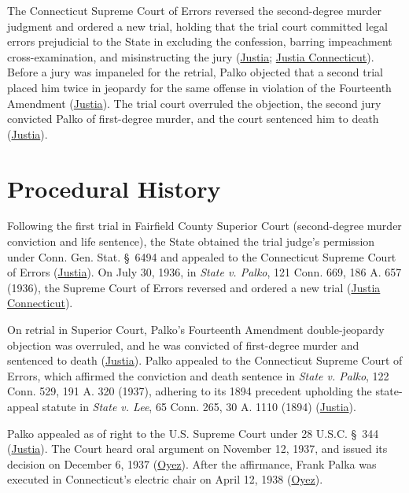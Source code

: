 \documentclass[12pt]{article}
\begin{document}
The Connecticut Supreme Court of Errors reversed the second-degree murder judgment and ordered a new trial, holding that the trial court committed legal errors prejudicial to the State in excluding the confession, barring impeachment cross-examination, and misinstructing the jury (\href{https://supreme.justia.com/cases/federal/us/302/319/}{Justia}; \href{https://law.justia.com/cases/connecticut/supreme-court/1936/121-conn-669.html}{Justia Connecticut}). Before a jury was impaneled for the retrial, Palko objected that a second trial placed him twice in jeopardy for the same offense in violation of the Fourteenth Amendment (\href{https://supreme.justia.com/cases/federal/us/302/319/}{Justia}). The trial court overruled the objection, the second jury convicted Palko of first-degree murder, and the court sentenced him to death (\href{https://supreme.justia.com/cases/federal/us/302/319/}{Justia}).

\section{Procedural History}

Following the first trial in Fairfield County Superior Court (second-degree murder conviction and life sentence), the State obtained the trial judge's permission under Conn. Gen. Stat. \S~6494 and appealed to the Connecticut Supreme Court of Errors (\href{https://supreme.justia.com/cases/federal/us/302/319/}{Justia}). On July 30, 1936, in \textit{State v. Palko}, 121 Conn. 669, 186 A. 657 (1936), the Supreme Court of Errors reversed and ordered a new trial (\href{https://law.justia.com/cases/connecticut/supreme-court/1936/121-conn-669.html}{Justia Connecticut}).

On retrial in Superior Court, Palko's Fourteenth Amendment double-jeopardy objection was overruled, and he was convicted of first-degree murder and sentenced to death (\href{https://supreme.justia.com/cases/federal/us/302/319/}{Justia}). Palko appealed to the Connecticut Supreme Court of Errors, which affirmed the conviction and death sentence in \textit{State v. Palko}, 122 Conn. 529, 191 A. 320 (1937), adhering to its 1894 precedent upholding the state-appeal statute in \textit{State v. Lee}, 65 Conn. 265, 30 A. 1110 (1894) (\href{https://supreme.justia.com/cases/federal/us/302/319/}{Justia}).

Palko appealed as of right to the U.S. Supreme Court under 28 U.S.C. \S~344 (\href{https://supreme.justia.com/cases/federal/us/302/319/}{Justia}). The Court heard oral argument on November 12, 1937, and issued its decision on December 6, 1937 (\href{https://www.oyez.org/cases/1900-1940/302us319}{Oyez}). After the affirmance, Frank Palka was executed in Connecticut's electric chair on April 12, 1938 (\href{https://www.oyez.org/cases/1900-1940/302us319}{Oyez}).
\end{document}
